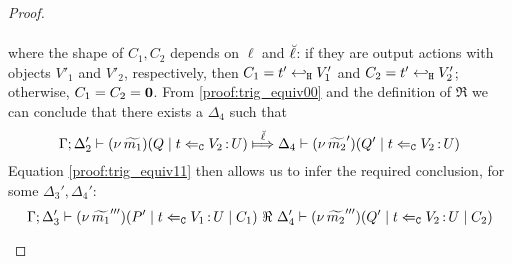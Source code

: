 \begin{proof}
\begin{enumerate}[1.]
\begin{enumerate}
\begin{eqnarray}
							\label{proof:trig_equiv11}
						\end{eqnarray}
										where the shape of $C_1, C_2$ depends on $\ell$ and $\breve{\ell}$:
				if they are output actions
				with objects $V'_1$ and $V'_2$, respectively, then 
				$C_1 = t' \hookleftarrow_{\mathtt{H}} V'_1$ and $C_2 = t' \hookleftarrow_{\mathtt{H}} V'_2$; 
				otherwise, $C_1 = C_2 = \mathbf{0}$.
							From \eqref{proof:trig_equiv00} and the definition of $\Re$
							we can conclude that there exists a $ \Delta_4$ such that
						\[
							\horel{\Gamma}{\Delta_2'}{\newsp{\widetilde{m_1}}{Q \Par \ftrigger{t}{V_2}{U}}}
							{\Hby{\mact{\ell}}}
							{\Delta_4}{\newsp{\widetilde{m_2}'}{Q' \Par \ftrigger{t}{V_2}{U}}}
						\]
							Equation \eqref{proof:trig_equiv11} then allows us to infer the required conclusion, for some $\Delta_3', \Delta_4'$:
						\[
							\Gamma; \Delta_3' \vdash (\nu\, \widetilde{m_1}''')(P' \;|\; t \Leftarrow_{\mathtt{C}} V_1{\,:\,}U \;|\; C_1) \ \Re\  \Delta_4' \vdash (\nu\, \widetilde{m_2}''')(Q' \;|\; t \Leftarrow_{\mathtt{C}} V_2{\,:\,}U \;|\; C_2)
						\]


\end{enumerate}
\end{enumerate}
\end{proof}
